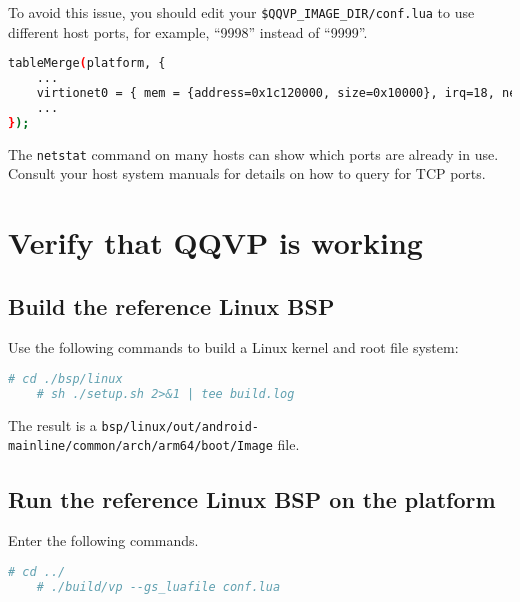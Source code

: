 {To avoid this issue, you should edit your
{\small{\lstinline!$QQVP_IMAGE_DIR/conf.lua!}} to use different host ports,
for example, ``9998'' instead of ``9999''.

\small
\begin{lstlisting}[language=bash]
tableMerge(platform, {
    ...
    virtionet0 = { mem = {address=0x1c120000, size=0x10000}, irq=18, netdev_str="type=user,hostfwd=tcp::2222-:22,hostfwd=tcp::2221-:21,hostfwd=tcp::9998-:1919"};
    ...
});
\end{lstlisting}
\normalsize

The {\small{\lstinline!netstat!}} command on many hosts can show which
ports are already in use. Consult your host system manuals for details
on how to query for TCP ports.

\clearpage
\section{Verify that QQVP is working}

\subsection{Build the reference Linux BSP}

Use the following commands to build a Linux kernel and root file system:

\small
\begin{lstlisting}[language=bash]
    # cd ./bsp/linux
    # sh ./setup.sh 2>&1 | tee build.log
\end{lstlisting}
\normalsize

The result is a {\small{\lstinline!bsp/linux/out/android-mainline/common/arch/arm64/boot/Image!}} file.



\subsection{Run the reference Linux BSP on the platform}

Enter the following commands.

\small
\begin{lstlisting}[language=bash]
    # cd ../
    # ./build/vp --gs_luafile conf.lua
\end{lstlisting}
\normalsize

}
